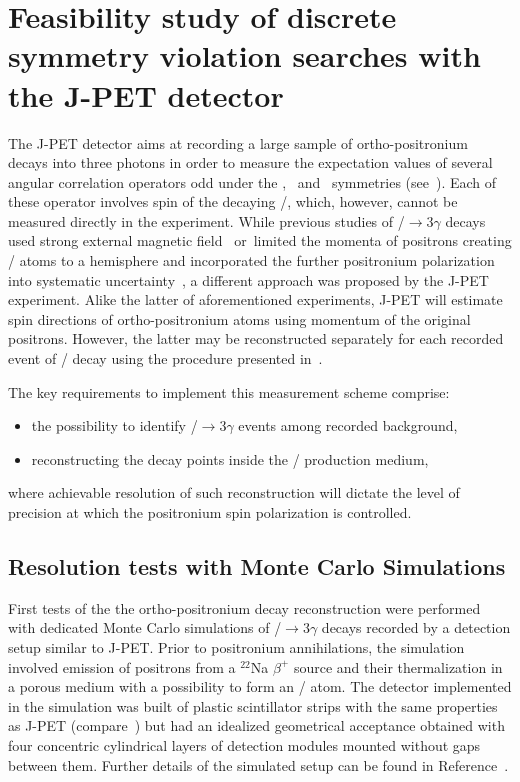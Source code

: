 \chapter{Feasibility study of discrete symmetry violation searches with the J-PET detector}
\label{chapter:analysis_jpet}

The J-PET detector aims at recording a large sample of ortho-positronium decays into three photons in order to measure the expectation values of several angular correlation operators odd under the \Ts, \CPs~and \CPTs~symmetries (see~). Each of these operator involves spin of the decaying \ops/, which, however, cannot be measured directly in the experiment.
While previous studies of \ops/$\to 3\gamma$ decays used strong external magnetic field~\cite{cp_positronium} or~limited the momenta of positrons creating \ops/ atoms to a hemisphere and incorporated the further positronium polarization into systematic uncertainty~\cite{cpt_positronium}, a different approach was proposed by the J-PET experiment.
Alike the latter of aforementioned experiments, J-PET will estimate spin directions of ortho-positronium atoms using momentum of the original positrons. However, the latter may be reconstructed separately for each recorded event of \ops/ decay using the procedure presented in~.

The key requirements to implement this measurement scheme comprise:
\begin{itemize}
\item the possibility to identify \ops/$\to 3\gamma$ events among recorded background,
\item reconstructing the decay points inside the \ops/ production medium,
\end{itemize}
where achievable resolution of such reconstruction will dictate the level of precision at which the positronium spin polarization is controlled.

\section{Resolution tests with Monte Carlo Simulations}
\label{sec:jpet_mc_tests}
First tests of the the ortho-positronium decay reconstruction were performed with dedicated Monte Carlo simulations
of \ops/$\to 3\gamma$ decays recorded by a detection setup similar to J-PET. 
Prior to positronium annihilations, the simulation involved emission of positrons from a $^{22}$Na $\beta^+$ source and their thermalization in a porous medium with a possibility to form an \ops/ atom. The detector implemented in the simulation was built of plastic scintillator strips with the same properties as J-PET (compare~) but had an idealized geometrical acceptance obtained with four concentric cylindrical layers of detection modules mounted without gaps between them. Further details of the simulated setup can be found in Reference~\cite{gajos_gps}.

